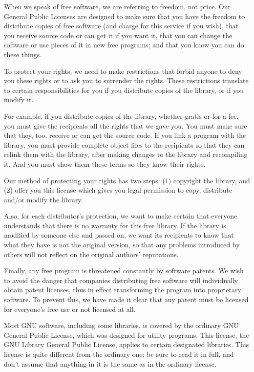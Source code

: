  When we speak of free software, we are referring to freedom, not
price.  Our General Public Licenses are designed to make sure that you
have the freedom to distribute copies of free software (and charge for
this service if you wish), that you receive source code or can get it
if you want it, that you can change the software or use pieces of it
in new free programs; and that you know you can do these things.

  To protect your rights, we need to make restrictions that forbid
anyone to deny you these rights or to ask you to surrender the rights.
These restrictions translate to certain responsibilities for you if
you distribute copies of the library, or if you modify it.

  For example, if you distribute copies of the library, whether gratis
or for a fee, you must give the recipients all the rights that we gave
you.  You must make sure that they, too, receive or can get the source
code.  If you link a program with the library, you must provide
complete object files to the recipients so that they can relink them
with the library, after making changes to the library and recompiling
it.  And you must show them these terms so they know their rights.

  Our method of protecting your rights has two steps: (1) copyright
the library, and (2) offer you this license which gives you legal
permission to copy, distribute and/or modify the library.

  Also, for each distributor's protection, we want to make certain
that everyone understands that there is no warranty for this free
library.  If the library is modified by someone else and passed on, we
want its recipients to know that what they have is not the original
version, so that any problems introduced by others will not reflect on
the original authors' reputations.

  Finally, any free program is threatened constantly by software
patents.  We wish to avoid the danger that companies distributing free
software will individually obtain patent licenses, thus in effect
transforming the program into proprietary software.  To prevent this,
we have made it clear that any patent must be licensed for everyone's
free use or not licensed at all.

  Most GNU software, including some libraries, is covered by the ordinary
GNU General Public License, which was designed for utility programs.  This
license, the GNU Library General Public License, applies to certain
designated libraries.  This license is quite different from the ordinary
one; be sure to read it in full, and don't assume that anything in it is
the same as in the ordinary license.


